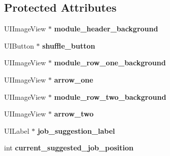 \subsection*{\-Protected \-Attributes}
\begin{DoxyCompactItemize}
\item 
\hypertarget{interface_job_suggestions_module_a18802e3895b8f6927fe564f036499902}{
\-U\-I\-Image\-View $\ast$ {\bfseries module\-\_\-header\-\_\-background}}
\label{interface_job_suggestions_module_a18802e3895b8f6927fe564f036499902}

\item 
\hypertarget{interface_job_suggestions_module_ae4ea76b8c2f3102fce87737efca8c097}{
\-U\-I\-Button $\ast$ {\bfseries shuffle\-\_\-button}}
\label{interface_job_suggestions_module_ae4ea76b8c2f3102fce87737efca8c097}

\item 
\hypertarget{interface_job_suggestions_module_a0a3b17510a088938feb5ce5e1a148026}{
\-U\-I\-Image\-View $\ast$ {\bfseries module\-\_\-row\-\_\-one\-\_\-background}}
\label{interface_job_suggestions_module_a0a3b17510a088938feb5ce5e1a148026}

\item 
\hypertarget{interface_job_suggestions_module_a5dc0415ccd03a7005f1bf3324126b3b2}{
\-U\-I\-Image\-View $\ast$ {\bfseries arrow\-\_\-one}}
\label{interface_job_suggestions_module_a5dc0415ccd03a7005f1bf3324126b3b2}

\item 
\hypertarget{interface_job_suggestions_module_a97b9c6b81ffa18bcbba4b7a092802e2e}{
\-U\-I\-Image\-View $\ast$ {\bfseries module\-\_\-row\-\_\-two\-\_\-background}}
\label{interface_job_suggestions_module_a97b9c6b81ffa18bcbba4b7a092802e2e}

\item 
\hypertarget{interface_job_suggestions_module_aa4e04db3c303a16da0d17c43cb2b5959}{
\-U\-I\-Image\-View $\ast$ {\bfseries arrow\-\_\-two}}
\label{interface_job_suggestions_module_aa4e04db3c303a16da0d17c43cb2b5959}

\item 
\hypertarget{interface_job_suggestions_module_a3daf7faa02cb2099f65e1bd5b01edacb}{
\-U\-I\-Label $\ast$ {\bfseries job\-\_\-suggestion\-\_\-label}}
\label{interface_job_suggestions_module_a3daf7faa02cb2099f65e1bd5b01edacb}

\item 
\hypertarget{interface_job_suggestions_module_aa3c27f9c90d0ce3f98074f49cafbc9d2}{
int {\bfseries current\-\_\-suggested\-\_\-job\-\_\-position}}
\label{interface_job_suggestions_module_aa3c27f9c90d0ce3f98074f49cafbc9d2}


\end{DoxyCompactItemize}
